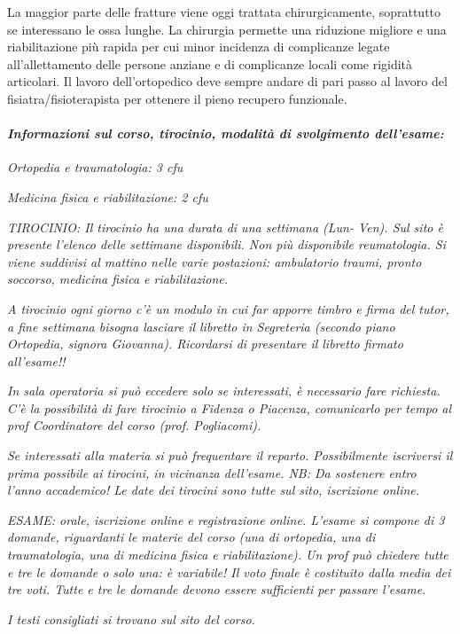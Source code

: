 La maggior parte delle fratture viene oggi trattata chirurgicamente, soprattutto se interessano le ossa lunghe. La chirurgia permette una riduzione migliore e una riabilitazione più rapida per cui minor incidenza di complicanze legate all'allettamento delle persone anziane e di complicanze locali come rigidità articolari. Il lavoro dell'ortopedico deve sempre andare di pari passo al lavoro del fisiatra/fisioterapista per ottenere il pieno recupero funzionale.

\newpage

\paragraph{\emph{Informazioni sul corso, tirocinio, modalità di svolgimento dell'esame:}}

\emph{Ortopedia e traumatologia: 3 cfu }

\emph{Medicina fisica e riabilitazione: 2 cfu }

\emph{TIROCINIO: Il tirocinio ha una durata di una settimana (Lun- Ven).
Sul sito è presente l'elenco delle settimane disponibili. Non più
disponibile reumatologia. Si viene suddivisi al mattino nelle varie
postazioni: ambulatorio traumi, pronto soccorso, medicina fisica e
riabilitazione.}

\emph{A tirocinio ogni giorno c'è un modulo in cui far apporre timbro e
firma del tutor, a fine settimana bisogna lasciare il libretto in
Segreteria (secondo piano Ortopedia, signora Giovanna). Ricordarsi di
presentare il libretto firmato all'esame!!}

\emph{In sala operatoria si può eccedere solo se interessati, è
necessario fare richiesta. C'è la possibilità di fare tirocinio a
Fidenza o Piacenza, comunicarlo per tempo al prof Coordinatore del corso
(prof. Pogliacomi).}

\emph{Se interessati alla materia si può frequentare il reparto.
Possibilmente iscriversi il prima possibile ai tirocini, in vicinanza
dell'esame. \emph{NB: Da sostenere entro l'anno accademico!} Le date dei
tirocini sono tutte sul sito, iscrizione online.}

\emph{ESAME: orale, iscrizione online e registrazione online. L'esame si
compone di 3 domande, riguardanti le materie del corso (una di
ortopedia, una di traumatologia, una di medicina fisica e
riabilitazione). Un prof può chiedere tutte e tre le domande o solo una:
è variabile! Il voto finale è costituito dalla media dei tre voti.
\emph{Tutte e tre le domande devono essere sufficienti per passare
l'esame}.}

\emph{I testi consigliati si trovano sul sito del corso.}
